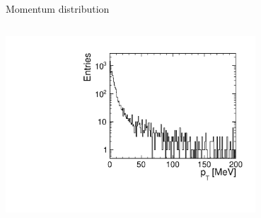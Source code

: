 \documentclass[aspectratio=169, hyperref={colorlinks=true,pdfpagelabels=false,linkcolor=black}, xcolor=dvipsnames,10pt]{beamer}
\begin{document}
\begin{frame}
\begin{block}{Momentum distribution}
\begin{columns}
		\includegraphics[width=0.7\textwidth]{../figures/incoherentPairs_pT.pdf} 

		\end{columns}	
	\end{block}
	
	
\end{frame}
\end{document}
